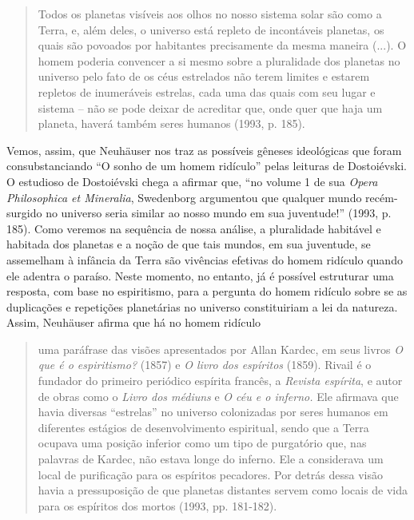 \begin{quote}
Todos os planetas visíveis aos olhos no nosso sistema solar são como a
Terra, e, além deles, o universo está repleto de incontáveis planetas,
os quais são povoados por habitantes precisamente da mesma maneira
(...). O homem poderia convencer a si mesmo sobre a pluralidade dos
planetas no universo pelo fato de os céus estrelados não terem limites e
estarem repletos de inumeráveis estrelas, cada uma das quais com seu
lugar e sistema -- não se pode deixar de acreditar que, onde quer que
haja um planeta, haverá também seres humanos (1993, p. 185).
\end{quote}

Vemos, assim, que Neuhäuser nos traz as possíveis gêneses ideológicas
que foram consubstanciando ``O sonho de um homem ridículo'' pelas
leituras de Dostoiévski. O estudioso de Dostoiévski chega a afirmar que,
``no volume 1 de sua \emph{Opera Philosophica et Mineralia}, Swedenborg
argumentou que qualquer mundo recém-surgido no universo seria similar ao
nosso mundo em sua juventude!'' (1993, p. 185). Como veremos na
sequência de nossa análise, a pluralidade habitável e habitada dos
planetas e a noção de que tais mundos, em sua juventude, se assemelham à
infância da Terra são vivências efetivas do homem ridículo quando ele
adentra o paraíso. Neste momento, no entanto, já é possível estruturar
uma resposta, com base no espiritismo, para a pergunta do homem ridículo
sobre se as duplicações e repetições planetárias no universo
constituiriam a lei da natureza. Assim, Neuhäuser afirma que há no homem
ridículo

\begin{quote}
uma paráfrase das visões apresentados por Allan Kardec, em seus livros
\emph{O que é o espiritismo?} (1857) e \emph{O livro dos espíritos}
(1859). Rivail é o fundador do primeiro periódico espírita francês, a
\emph{Revista espírita}, e autor de obras como o \emph{Livro dos
médiuns} e \emph{O céu e o inferno.} Ele afirmava que havia diversas
``estrelas'' no universo colonizadas por seres humanos em diferentes
estágios de desenvolvimento espiritual, sendo que a Terra ocupava uma
posição inferior como um tipo de purgatório que, nas palavras de Kardec,
não estava longe do inferno. Ele a considerava um local de purificação
para os espíritos pecadores. Por detrás dessa visão havia a
pressuposição de que planetas distantes servem como locais de vida para
os espíritos dos mortos (1993, pp. 181-182).
\end{quote}

